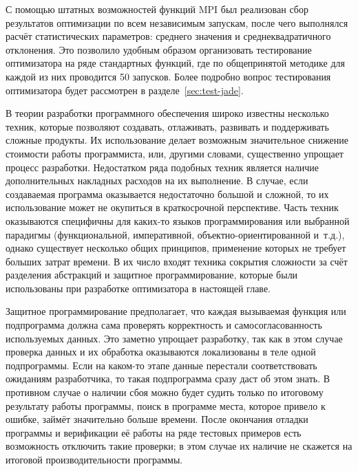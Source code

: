 С помощью штатных возможностей функций MPI был реализован сбор
результатов оптимизации по всем независимым запускам, после чего
выполнялся расчёт статистических параметров: среднего значения и
среднеквадратичного отклонения. Это позволило удобным образом
организовать тестирование оптимизатора на ряде стандартных функций,
где по общепринятой методике для каждой из них проводится 50 запусков.
 Более подробно вопрос тестирования оптимизатора
будет рассмотрен в разделе~\ref{sec:test-jade}.

В теории разработки программного обеспечения широко известны несколько
техник, которые позволяют создавать, отлаживать, развивать и
поддерживать сложные продукты.  Их использование делает возможным
значительное снижение стоимости работы программиста, или, другими
словами, существенно упрощает  процесс разработки.  Недостатком ряда
подобных техник является наличие дополнительных накладных расходов на
их выполнение.  В случае, если создаваемая программа оказывается
недостаточно большой и сложной, то их использование может не окупиться
в краткосрочной перспективе.  Часть техник оказываются специфичны для
каких-то языков программирования или выбранной парадигмы
(функциональной, императивной, объектно-ориентированной и~т.д.),
однако существует несколько общих принципов, применение которых не
требует больших затрат времени. В их число входят техника сокрытия
сложности за счёт разделения абстракций и защитное программирование,
которые были использованы при разработке оптимизатора в настоящей
главе.

Защитное программирование предполагает, что каждая вызываемая функция
или подпрограмма должна сама проверять корректность и
самосогласованность используемых данных. Это заметно упрощает
разработку, так как в этом случае проверка данных и их обработка
оказываются локализованы в теле одной подпрограммы. Если на каком-то
этапе данные перестали соответствовать ожиданиям разработчика, то
такая подпрограмма сразу даст об этом знать. В противном случае о
наличии сбоя можно будет судить только по итоговому результату работы
программы, поиск в программе места, которое привело к ошибке, займёт
значительно больше времени. После окончания отладки программы и
верификации её работы на ряде тестовых примеров есть возможность
отключить такие проверки; в этом случае их наличие не скажется на
итоговой производительности программы.

